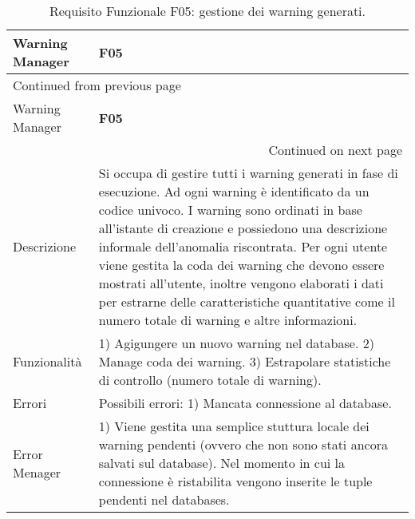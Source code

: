 \documentclass[onecolumn,a4paper]{article}
\begin{document}
\begin{longtable}{|p{3cm}|p{10cm}|}
\caption{Requisito Funzionale F05: gestione dei warning generati.}
\\
\cellcolor{grey!15}Warning Manager & \cellcolor{grey!15} \textbf{F05}\\
\hline
\endfirsthead
\multicolumn{2}{l}{Continued from previous page} \\
\hline

\cellcolor{grey!15}Warning Manager & \cellcolor{grey!15} \textbf{F05} \\

\hline
\endhead
\hline\multicolumn{2}{r}{Continued on next page} \\
\endfoot
\endlastfoot
\hline
Descrizione & Si occupa di gestire tutti i warning generati in fase di esecuzione. Ad ogni warning è identificato da un codice univoco. I warning sono ordinati in base all'istante di creazione e possiedono una descrizione informale dell'anomalia riscontrata. Per ogni utente viene gestita la coda dei warning che devono essere mostrati all'utente, inoltre vengono elaborati i dati per estrarne delle caratteristiche quantitative come il numero totale di warning e altre informazioni.\\
\hline
Funzionalità & 1) Agigungere un nuovo warning nel database. 2) Manage coda dei warning. 3) Estrapolare statistiche di controllo (numero totale di warning).\\
\hline
Errori & Possibili errori: 1) Mancata connessione al database.\\
\hline
Error Menager & 1) Viene gestita una semplice stuttura locale dei warning pendenti (ovvero che non sono stati ancora salvati sul database). Nel momento in cui la connessione è ristabilita vengono inserite le tuple pendenti nel databases.\\
\hline
\end{longtable}
\end{document}

